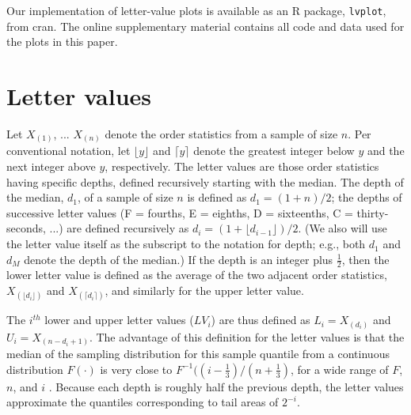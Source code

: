 \documentclass[12pt,oneside]{article}
\begin{document}
Our implementation of letter-value plots is available as an R package, \texttt{lvplot}, from {\sc cran}. The online supplementary material contains all code and data used for the plots in this paper.

\section{Letter values}
\label{sec:letter-values}

Let $X_{(1)}$, ... $X_{(n)}$ denote the order statistics from a sample of size $n$. Per conventional notation, let $\lfloor y \rfloor$ and $\lceil y \rceil$ denote the greatest integer below $y$ and the next integer above $y$, respectively. The letter values are those order statistics having specific depths, defined recursively starting with the median. The depth of the median, $d_1$, of a sample of size $n$ is defined as $d_1 = (1 + n )/2$; the depths of successive letter values (F = fourths, E = eighths, D = sixteenths, C = thirty-seconds, ...) are defined recursively as $d_i = (1 + \lfloor d_{i-1} \rfloor)/2$. (We also will use the letter value itself as the subscript to the notation for depth; e.g., both $d_1$ and $d_M$ denote the depth of the median.) If the depth is an integer plus $\frac{1}{2}$, then the lower letter value is defined as the average of the two adjacent order statistics, $X_{(\lfloor d_i \rfloor)}$ and $X_{(\lceil d_i \rceil)}$, and similarly for the upper letter value.

The $i^{th}$ lower and upper letter values ($LV_i$) are thus defined as $L_i = X_{(d_i)}$ and $U_i = X_{(n - d_i + 1)}$. The advantage of this definition for the letter values is that the median of the sampling distribution for this sample quantile from a continuous distribution $F(\cdot)$ is very close to $F^{-1} ((i - \frac{1}{3})/(n + \frac{1}{3})$, for a wide range of $F$, $n$, and $i$ \citep{dchlv}. Because each depth is roughly half the previous depth, the letter values approximate the quantiles corresponding to tail areas of $2^{-i}$.
\end{document}
